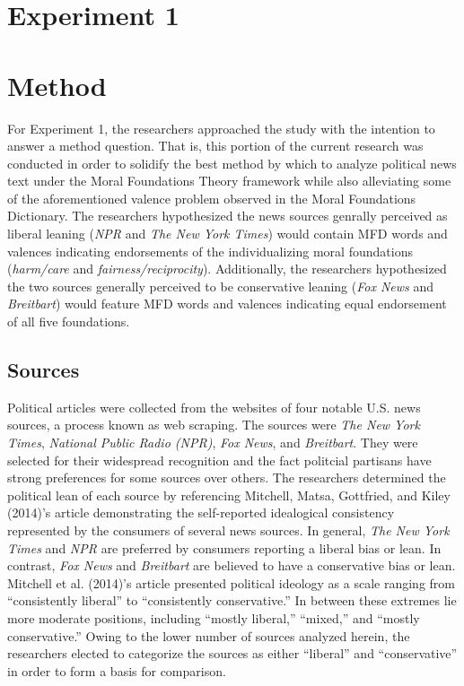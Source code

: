 \documentclass[english,,man]{apa6}
\begin{document}
\hypertarget{experiment-1}{%
\section{Experiment 1}\label{experiment-1}}

\hypertarget{method}{%
\section{Method}\label{method}}

For Experiment 1, the researchers approached the study with the intention to answer a method question. That is, this portion of the current research was conducted in order to solidify the best method by which to analyze political news text under the Moral Foundations Theory framework while also alleviating some of the aforementioned valence problem observed in the Moral Foundations Dictionary. The researchers hypothesized the news sources genrally perceived as liberal leaning (\emph{NPR} and \emph{The New York Times}) would contain MFD words and valences indicating endorsements of the individualizing moral foundations (\emph{harm/care} and \emph{fairness/reciprocity}). Additionally, the researchers hypothesized the two sources generally perceived to be conservative leaning (\emph{Fox News} and \emph{Breitbart}) would feature MFD words and valences indicating equal endorsement of all five foundations.

\hypertarget{sources}{%
\subsection{Sources}\label{sources}}

Political articles were collected from the websites of four notable U.S. news sources, a process known as web scraping. The sources were \emph{The New York Times}, \emph{National Public Radio (NPR)}, \emph{Fox News}, and \emph{Breitbart}. They were selected for their widespread recognition and the fact politcial partisans have strong preferences for some sources over others. The researchers determined the political lean of each source by referencing Mitchell, Matsa, Gottfried, and Kiley (2014)'s article demonstrating the self-reported idealogical consistency represented by the consumers of several news sources. In general, \emph{The New York Times} and \emph{NPR} are preferred by consumers reporting a liberal bias or lean. In contrast, \emph{Fox News} and \emph{Breitbart} are believed to have a conservative bias or lean. Mitchell et al. (2014)'s article presented political ideology as a scale ranging from \enquote{consistently liberal} to \enquote{consistently conservative.} In between these extremes lie more moderate positions, including \enquote{mostly liberal,} \enquote{mixed,} and \enquote{mostly conservative.} Owing to the lower number of sources analyzed herein, the researchers elected to categorize the sources as either \enquote{liberal} and \enquote{conservative} in order to form a basis for comparison.
\end{document}
